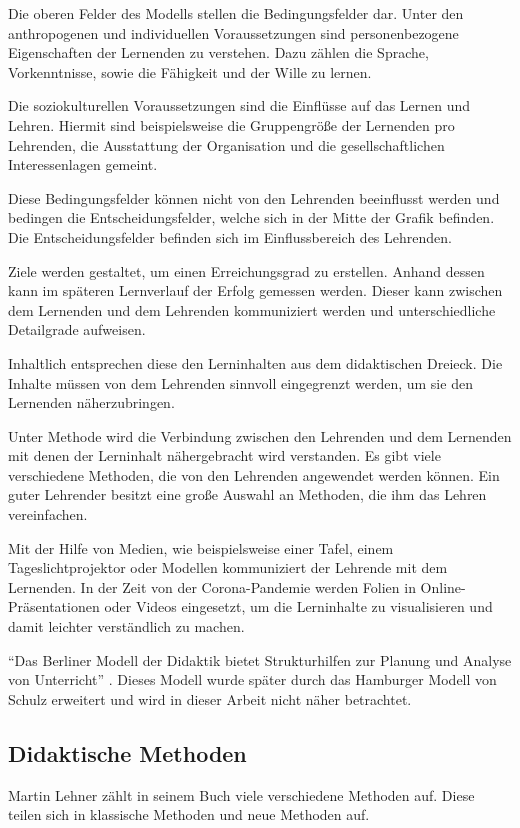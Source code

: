 Die oberen Felder des Modells stellen die Bedingungsfelder dar. Unter den anthropogenen und individuellen Voraussetzungen sind personenbezogene Eigenschaften der Lernenden zu verstehen. Dazu zählen die Sprache, Vorkenntnisse, sowie die Fähigkeit und der Wille zu lernen. 

Die soziokulturellen Voraussetzungen sind die Einflüsse auf das Lernen und Lehren. Hiermit sind beispielsweise die Gruppengröße der Lernenden pro Lehrenden, die Ausstattung der Organisation und die gesellschaftlichen Interessenlagen gemeint. 

Diese Bedingungsfelder können nicht von den Lehrenden beeinflusst werden und bedingen die Entscheidungsfelder, welche sich in der Mitte der Grafik befinden. Die Entscheidungsfelder befinden sich im Einflussbereich des Lehrenden.

Ziele werden gestaltet, um einen Erreichungsgrad zu erstellen. Anhand dessen kann im späteren Lernverlauf der Erfolg gemessen werden. Dieser kann zwischen dem Lernenden und dem Lehrenden kommuniziert werden und unterschiedliche Detailgrade aufweisen. 

Inhaltlich entsprechen diese den Lerninhalten aus dem didaktischen Dreieck. Die Inhalte müssen von dem Lehrenden sinnvoll eingegrenzt werden, um sie den Lernenden näherzubringen. 

Unter Methode wird die Verbindung zwischen den Lehrenden und dem Lernenden mit denen der Lerninhalt nähergebracht wird verstanden. Es gibt viele verschiedene Methoden, die von den Lehrenden angewendet werden können. Ein guter Lehrender besitzt eine große Auswahl an Methoden, die ihm das Lehren vereinfachen.

Mit der Hilfe von Medien, wie beispielsweise einer Tafel, einem Tageslichtprojektor oder Modellen kommuniziert der Lehrende mit dem Lernenden. In der Zeit von der Corona-Pandemie werden Folien in Online-Präsentationen oder Videos eingesetzt, um die Lerninhalte zu visualisieren und damit leichter verständlich zu machen. 

\enquote{Das Berliner Modell der Didaktik bietet Strukturhilfen zur Planung und Analyse von Unterricht} \autocite[][S. 57]{Lehner.2019}. Dieses Modell wurde später durch das Hamburger Modell von Schulz erweitert und wird in dieser Arbeit nicht näher betrachtet. \autocite[Die Ausführungen in diesem Kapitel beziehen sich weitgehend auf][]{Lehner.2019}

\subsection{Didaktische Methoden}
 Martin Lehner zählt in seinem Buch viele verschiedene Methoden auf. Diese teilen sich in klassische Methoden und neue Methoden auf. 

